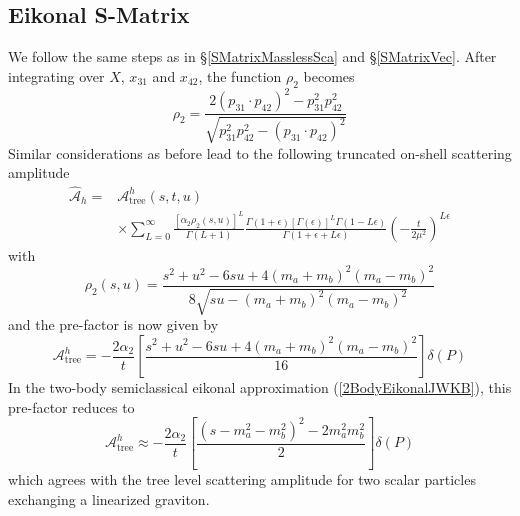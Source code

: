 \subsection{Eikonal S-Matrix}
We follow the same steps as in \S\ref{SMatrixMasslessSca} and \S\ref{SMatrixVec}. After integrating over $X$, $x_{31}$ and $x_{42}$, the function $\rho_{2}$ becomes
\begin{equation}
	\rho_{2} = \frac{2(p_{31} \cdot p_{42})^{2} - p_{31}^{2} p_{42}^{2}}{\sqrt{p_{31}^{2} p_{42}^{2} - (p_{31} \cdot p_{42})^{2}}}
\end{equation}
Similar considerations as before lead to the following truncated on-shell scattering amplitude
\begin{equation}
\begin{split}
	\widehat{\mathcal{A}}_{h} = {}& \mathcal{A}_{\text{tree}}^{h}(s, t, u) \\
	&\times \sum_{L = 0}^{\infty} \frac{\left[\alpha_{2} \rho_{2}(s, u) \right]^{L}}{\Gamma(L + 1)} \frac{\Gamma(1 + \epsilon) [\Gamma(\epsilon)]^{L} \Gamma(1 - L \epsilon)}{\Gamma(1 + \epsilon + L \epsilon)} \left( -\frac{t}{2 \mu^{2}} \right)^{L \epsilon}
\end{split} \label{hatATen}
\end{equation}
with
\begin{equation}
	\rho_{2}(s, u) = \frac{s^{2} + u^{2} - 6 s u + 4 (m_{a} + m_{b})^{2} (m_{a} - m_{b})^{2}}{8\sqrt{s u - (m_{a} + m_{b})^{2} (m_{a} - m_{b})^{2}}}
\end{equation}
and the pre-factor is now given by
\begin{equation}
	\mathcal{A}_{\text{tree}}^{h} = - \frac{2 \alpha_{2}}{t} \left[ \frac{s^{2} + u^{2} - 6 s u + 4 (m_{a} + m_{b})^{2} (m_{a} - m_{b})^{2}}{16} \right] \delta(P)
\end{equation}
In the two-body semiclassical eikonal approximation (\ref{2BodyEikonalJWKB}), this pre-factor reduces to
\begin{equation}
	\mathcal{A}_{\text{tree}}^{h} \approx - \frac{2 \alpha_{2}}{t} \left[ \frac{(s - m_{a}^{2} - m_{b}^{2})^{2} - 2 m_{a}^{2} m_{b}^{2}}{2} \right] \delta(P)
\end{equation}
which agrees with the tree level scattering amplitude for two scalar particles exchanging a linearized graviton.

